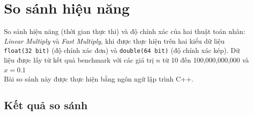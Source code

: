 \section{So sánh hiệu năng}
So sánh hiệu năng (thời gian thực thi) và độ chính xác của hai thuật toán nhân: \textit{Linear Multiply} và \textit{Fast Multiply}, khi được thực hiện trên hai kiểu dữ liệu \texttt{float(32 bit)} (độ chính xác đơn) và \texttt{double(64 bit)} (độ chính xác kép). Dữ liệu được lấy từ kết quả benchmark với các giá trị $n$ từ 10 đến 100,000,000,000 và $x=0.1$\\

Bài so sánh này được thực hiện bằng ngôn ngữ lập trình C++.

\subsection{Kết quả so sánh}
